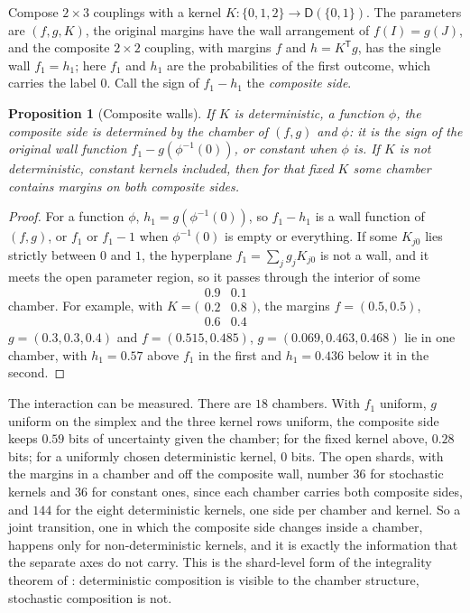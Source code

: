 \documentclass[11pt]{article}
\newtheorem{proposition}[theorem]{Proposition}
\theoremstyle{definition}
\theoremstyle{remark}
\newcommand{\D}{\mathsf{D}}
\newcommand{\T}{\mathsf T}
\begin{document}
Compose $2\times3$ couplings with a kernel $K\colon\{0,1,2\}\to\D(\{0,1\})$. The parameters are $(f,g,K)$, the original margins have the
wall arrangement of $f(I)=g(J)$, and the composite $2\times2$ coupling, with margins $f$ and $h=K^\T g$, has the single wall $f_1=h_1$; here $f_1$ and $h_1$ are the probabilities of the first outcome, which carries the label $0$. Call
the sign of $f_1-h_1$ the \emph{composite side}.

\begin{proposition}[Composite walls]\label{prop:compositewalls}
If $K$ is deterministic, a function $\phi$, the composite side is determined by the chamber of $(f,g)$ and $\phi$: it is the sign of the
original wall function $f_1-g(\phi^{-1}(0))$, or constant when $\phi$ is. If $K$ is not deterministic, constant kernels included, then for
that fixed $K$ some chamber contains margins on both composite sides.
\end{proposition}
\begin{proof}
For a function $\phi$, $h_1=g(\phi^{-1}(0))$, so $f_1-h_1$ is a wall function of $(f,g)$, or $f_1$ or $f_1-1$ when $\phi^{-1}(0)$ is empty or
everything. If some $K_{j0}$ lies strictly between $0$ and $1$, the hyperplane $f_1=\sum_jg_jK_{j0}$ is not a wall, and it meets the open
parameter region, so it passes through the interior of some chamber. For example, with
$K=\bigl(\begin{smallmatrix}0.9&0.1\\0.2&0.8\\0.6&0.4\end{smallmatrix}\bigr)$, the margins $f=(0.5,0.5)$, $g=(0.3,0.3,0.4)$ and $f=(0.515,0.485)$,
$g=(0.069,0.463,0.468)$ lie in one chamber, with $h_1=0.57$ above $f_1$ in the first and $h_1=0.436$ below it in the second.
\end{proof}

The interaction can be measured. There are $18$ chambers. With $f_1$ uniform, $g$ uniform on the simplex and the three kernel rows
uniform, the composite side keeps $0.59$ bits of uncertainty given the chamber; for the fixed kernel above, $0.28$ bits; for a uniformly
chosen deterministic kernel, $0$ bits. The open shards, with the margins in a chamber and off the composite wall, number $36$ for stochastic
kernels and $36$ for constant ones, since each chamber carries both composite sides, and $144$ for the eight deterministic kernels, one side
per chamber and kernel. So a joint transition, one in which the composite side changes inside a chamber, happens only for non-deterministic
kernels, and it is exactly the information that the separate axes do not carry. This is the shard-level form of the integrality theorem
of \cite[Thm.~6.1]{Bridges}: deterministic composition is visible to the chamber structure, stochastic composition is not.
\end{document}
